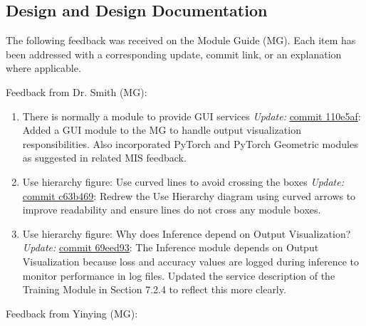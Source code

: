 \documentclass{article}
\begin{document}
\subsection{Design and Design Documentation}

The following feedback was received on the Module Guide (MG). Each item has been addressed with a corresponding update, commit link, or an explanation where applicable.

Feedback from Dr. Smith (MG):

\begin{enumerate}
    \item There is normally a module to provide GUI services  
    \newline \textit{Update:} \href{https://github.com/Yuanqi-X/Re-ProtGNN/commit/110e5af42b95e0e2073dd210856fcb36ee906770}{commit 110e5af}: Added a GUI module to the MG to handle output visualization responsibilities. Also incorporated PyTorch and PyTorch Geometric modules as suggested in related MIS feedback.

    \item Use hierarchy figure: Use curved lines to avoid crossing the boxes  
    \newline \textit{Update:} \href{https://github.com/Yuanqi-X/Re-ProtGNN/commit/c63b4697d6cd24cf70065b1e395d4545e6ac8238}{commit c63b469}: Redrew the Use Hierarchy diagram using curved arrows to improve readability and ensure lines do not cross any module boxes.

    \item Use hierarchy figure: Why does Inference depend on Output Visualization?  
    \newline \textit{Update:} \href{https://github.com/Yuanqi-X/Re-ProtGNN/commit/69eed93}{commit 69eed93}: The Inference module depends on Output Visualization because loss and accuracy values are logged during inference to monitor performance in log files. Updated the service description of the Training Module in Section 7.2.4 to reflect this more clearly.

\end{enumerate}

Feedback from Yinying (MG):
\end{document}
